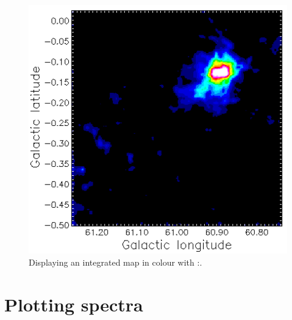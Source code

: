 \documentclass[11pt,oneside,chapters]{starlink}
\begin{document}
\begin{itemize}
\begin{figure}[h!]
\begin{center}
\includegraphics[width=0.5\linewidth]{sc20_display10}
\caption[Displaying an integrated map in colour with \Kappa:\display.]{\label{fig:display10}
  Displaying an integrated map in colour with \Kappa:\display.}
\end{center}
\end{figure}

\end{itemize}

\section{Plotting spectra}
\end{document}
